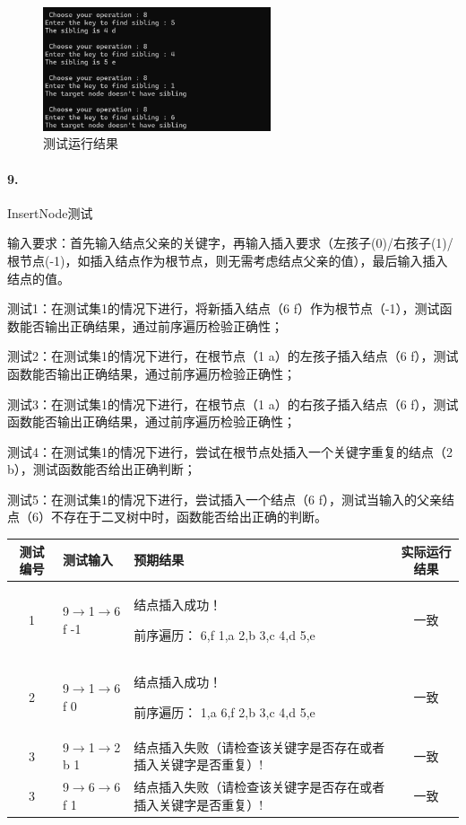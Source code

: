 \documentclass[supercite]{Experimental_Report}
\theoremstyle{definition}
\begin{document}
~\

\begin{figure}[H]
 	\centering
 	\includegraphics[width=0.6\textwidth]{images/二叉树测试8.png}
 	\caption{测试运行结果}
 	\label{txlab}
 \end{figure}

\paragraph{ 9.}InsertNode测试

输入要求：首先输入结点父亲的关键字，再输入插入要求（左孩子(0)/右孩子(1)/根节点(-1)，如插入结点作为根节点，则无需考虑结点父亲的值），最后输入插入结点的值。

测试1：在测试集1的情况下进行，将新插入结点（6 f）作为根节点（-1），测试函数能否输出正确结果，通过前序遍历检验正确性；

测试2：在测试集1的情况下进行，在根节点（1 a）的左孩子插入结点（6 f），测试函数能否输出正确结果，通过前序遍历检验正确性；

测试3：在测试集1的情况下进行，在根节点（1 a）的右孩子插入结点（6 f），测试函数能否输出正确结果，通过前序遍历检验正确性；

测试4：在测试集1的情况下进行，尝试在根节点处插入一个关键字重复的结点（2 b），测试函数能否给出正确判断；

测试5：在测试集1的情况下进行，尝试插入一个结点（6 f），测试当输入的父亲结点（6）不存在于二叉树中时，函数能否给出正确的判断。

\vspace{0.5em}

\begin{tabular}{|c|l|p{6cm}|c|}
	\hline
	测试编号 & 测试输入 & 预期结果 & 实际运行结果 \\
	\hline
	1 & 9$\rightarrow$1$\rightarrow$6 f -1 & 结点插入成功！

前序遍历： 6,f 1,a 2,b 3,c 4,d 5,e & 一致 \\
	\hline
	2 & 9$\rightarrow$1$\rightarrow$6 f 0 & 结点插入成功！

前序遍历：  1,a 6,f 2,b 3,c 4,d 5,e & 一致 \\
	\hline
	3 & 9$\rightarrow$1$\rightarrow$2 b 1 & 结点插入失败（请检查该关键字是否存在或者插入关键字是否重复）! & 一致 \\
	\hline
	3 & 9$\rightarrow$6$\rightarrow$6 f 1 & 结点插入失败（请检查该关键字是否存在或者插入关键字是否重复）! & 一致 \\
	\hline
\end{tabular}
\end{document}
